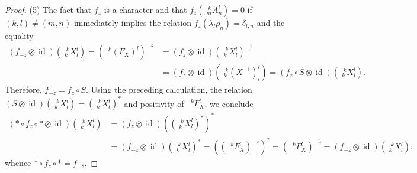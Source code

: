 \documentclass[12pt]{article}
\theoremstyle{change}
\DeclareMathOperator{\id}{id}
\newcommand{\Gr}[5]{\;{}^{\;#2}_{#4}#1_{#5}^{#3}}%
\newcommand{\Gru}[3]{\;{}^{\;#2}#1^{#3}}
\theoremstyle{definition}
\numberwithin{equation}{section}
\begin{document}
\begin{proof}
     (5) The fact that $f_{z}$ is a character and
     that $f_{z}(\Gr{A}{k}{l}{m}{n})=0$ if $(k,l)\neq (m,n)$
     immediately implies the relation
     $f_{z}(\lambda_{l}\rho_{n})=\delta_{l,n}$  and the equality
     \begin{align*}
       (f_{-z} \otimes \id) (\Gr{X}{k}{l}{k}{l})=
       (\Gru{(F_{X})}{k}{l})^{-z} &= (f_{z} \otimes
       \id)(\Gr{X}{k}{l}{k}{l})^{-1} \\ &= (f_{z} \otimes
       \id)(\Gr{(X^{-1})}{k}{l}{k}{l}) = (f_{z} \circ S \otimes
       \id)(\Gr{X}{k}{l}{k}{l}).
     \end{align*}
Therefore, $f_{-z} = f_{z} \circ S$. Using the preceding calculation,
     the relation $(S \otimes \id)(\Gr{X}{k}{l}{k}{l}) =
     (\Gr{X}{k}{l}{k}{l})^{*}$ and positivity of $\Gru{F_{X}}{k}{l}$,
     we conclude
     \begin{align*}
       (\ast \circ f_{z} \circ \ast \otimes
       \id)(\Gr{X}{k}{l}{k}{l})
&=       (f_{z} \otimes
       \id)((\Gr{X}{k}{l}{k}{l})^{*})^{*} \\
& = (f_{-z} \otimes \id)(\Gr{X}{k}{l}{k}{l})^{*} 
 =
((\Gru{F_{X}}{k}{l})^{-z})^{*} 
=       (\Gru{F_{X}}{k}{l})^{-\overline{z}} = (f_{-\overline{z}}
\otimes \id)(\Gr{X}{k}{l}{k}{l}),
     \end{align*}
whence $\ast \circ f_{z} \circ \ast = f_{-\overline{z}}$.
\end{proof}

\end{document}
